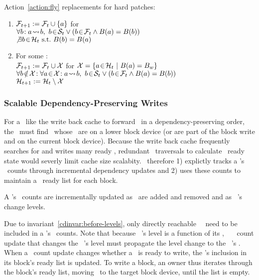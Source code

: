 \noindent Action~\ref{action:fly} replacements for hard patches:
\begin{enumerate}
\item \(\mathcal{F}_{t+1} := \mathcal{F}_{t} \cup \{a\}\) for
\\
\(\forall b\!: \indirdepends{a}{b},\ \inset{b}{\psetsat{t}} \lor (\inset{b}{\psetinflight{t}} \land \blockof{a} = \blockof{b})\)\\
\(\not\exists\inset{b}{\psethard{t}}\ \mbox{s.t.}\ \blockof{b} = \blockof{a}\)

\item For some :\\
\(\mathcal{F}_{t+1} := \mathcal{F}_{t} \cup \mathcal{X}\) for
\(\mathcal{X} = \{a\! \in\! \mathcal{H}_{t}\ |\ B(a) = B_{w}\}\)\\
\(\forall \notinset{b}{\pset{X}}\!: \forall \inset{a}{\pset{X}}\!:
\indirdepends{a}{b},\ \inset{b}{\psetsat{t}} \lor
(\inset{b}{\psetinflight{t}} \land \blockof{a} = \blockof{b})\)\\
\(\mathcal{H}_{t+1} := \mathcal{H}_{t} \setminus \mathcal{X}\)
\end{enumerate}

\subsubsection{Scalable Dependency-Preserving Writes}
For a \module\ like the write back cache to forward \chdescs\ in a
dependency-preserving order, the \module\ must find \chdescs\ whose
\befores\ are on a lower block device (or are part of the block write
and on the current block device). Because the write back cache
frequently searches for and writes many ready \chdescs, redundant
\before\ traversals to calculate \chdesc\ ready state would severly
limit cache size scalabity.
%
\Kudos\ therefore
%
1) explictly tracks a \chdesc's \before\ counts through incremental
dependency updates
%
and 2) uses these counts to maintain a \chdesc\ ready list for each
block.

A \chdesc's \before\ counts are incrementally updated
%
as \befores\ are added and removed
%
and as \beforing\ \chdesc's change levels.
%

Due to invariant~\ref{cdinvar:before-levels}, only directly reachable
\beforing\ \chdescs\ need to be included in a \chdesc's \before\ counts.
%
Note that because \anoop\ \chdesc's level is a function of its \befores,
%
\anoop\ \chdesc\ \before\ count update that changes the \noop\ \chdesc's level
must propagate the level change to the \noop\ \chdesc's \afters.
%
When a \before\ count update changes whether a \chdesc\ is ready to
write, the \chdesc's inclusion in its block's ready list is updated.
%
To write a block, an owner thus iterates through the block's ready
list, moving \chdescs\ to the target block device, until the list is
empty.

